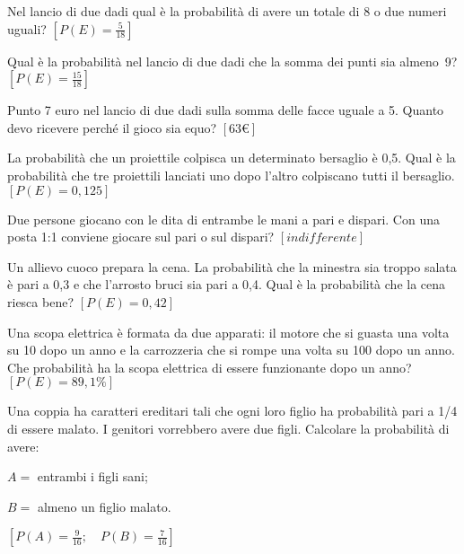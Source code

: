 \begin{esercizio}[\Ast]
 \label{ese:9.48}
Nel lancio di due dadi qual è la probabilità di avere un totale di 8 o due 
numeri uguali?
\hfill \(\left[P(E)=\frac 5{18}\right]\)
\end{esercizio}

\begin{esercizio}[\Ast]
 \label{ese:9.49}
Qual è la probabilità nel lancio di due dadi che la somma dei punti sia 
almeno~9?
\hfill \(\left[P(E)=\frac{15}{18}\right]\)
\end{esercizio}

\begin{esercizio}[\Ast]
 \label{ese:9.50}
Punto 7 euro nel lancio di due dadi sulla somma delle facce uguale a 5. Quanto 
devo ricevere perché il gioco sia equo?
\hfill \(\left[63\text{€}\right]\)
\end{esercizio}

\begin{esercizio}[\Ast]
 \label{ese:9.51}
La probabilità che un proiettile colpisca un determinato bersaglio è 0,5. Qual è 
la probabilità che tre proiettili lanciati uno dopo l'altro colpiscano tutti il 
bersaglio.
\hfill \(\left[P(E)=0,125\right]\)
\end{esercizio}

\begin{esercizio}[\Ast]
 \label{ese:9.52}
Due persone giocano con le dita di entrambe le mani a pari e dispari. Con una 
posta 1:1 conviene giocare sul pari o sul dispari?
\hfill \(\left[indifferente\right]\)
\end{esercizio}

\begin{esercizio}[\Ast]
 \label{ese:9.53}
Un allievo cuoco prepara la cena. La probabilità che la minestra sia troppo 
salata è pari a 0,3 e che l'arrosto bruci sia pari a 0,4. Qual è la probabilità 
che la cena riesca bene?
\hfill \(\left[P(E)=0,42\right]\)
\end{esercizio}

\begin{esercizio}[\Ast]
 \label{ese:9.54}
Una scopa elettrica è formata da due apparati: il motore che si guasta una volta 
su 10 dopo un anno e la carrozzeria che si rompe una volta su 100 dopo un anno. 
Che probabilità ha la scopa elettrica di essere funzionante dopo un anno?
\hfill \(\left[P(E)=89,1\%\right]\)
\end{esercizio}

\begin{esercizio}[\Ast]
 \label{ese:9.55}
Una coppia ha caratteri ereditari tali che ogni loro figlio ha probabilità pari 
a 1/4 di essere malato. I genitori vorrebbero avere due figli. Calcolare la 
probabilità di avere:
\begin{itemize*}
\item \( A= \) entrambi i figli sani;
\item \( B= \) almeno un figlio malato.
\end{itemize*}
\hfill \(\left[P(A)=\frac 9 {16}; \quad P(B)=\frac 7 {16}\right]\)
\end{esercizio}

